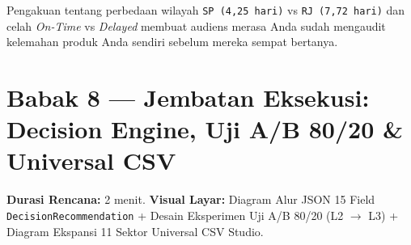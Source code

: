 \documentclass[11pt,a4paper,oneside]{book}
\newcommand{\code}[1]{{\small\nolinkurl{#1}}}
\begin{document}
\begin{tipbox}
Pengakuan tentang perbedaan wilayah \code{SP (4,25 hari)} vs \code{RJ (7,72 hari)} dan celah \emph{On-Time} vs \emph{Delayed} membuat audiens merasa Anda sudah mengaudit kelemahan produk Anda sendiri sebelum mereka sempat bertanya.
\end{tipbox}

\section{Babak 8 --- Jembatan Eksekusi: Decision Engine, Uji A/B 80/20 \& Universal CSV}

\begin{stagebox}
\textbf{Durasi Rencana:} 2 menit. \quad \textbf{Visual Layar:} Diagram Alur JSON 15 Field \code{DecisionRecommendation} + Desain Eksperimen Uji A/B 80/20 (L2 $\rightarrow$ L3) + Diagram Ekspansi 11 Sektor Universal CSV Studio.
\end{stagebox}
\end{document}
